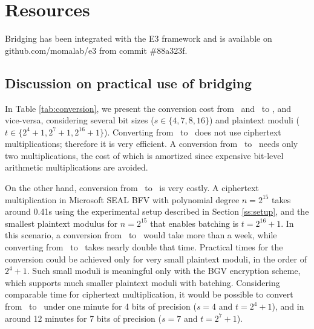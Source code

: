 
\vspace{-0.1cm}
\section*{Resources}

Bridging has been integrated with the E3 framework and is available on github.com/momalab/e3 from commit \#88a323f.
\subsection{Discussion on practical use of bridging}\label{ss:discussion}

In Table \ref{tab:conversion}, we present the conversion cost from \secuint\ and \secint\ to \secmod, and vice-versa, considering several bit sizes ($s \in \{4, 7, 8, 16\}$) and plaintext moduli ($t \in \{2^4+1, 2^7+1, 2^{16}+1\}$).
Converting from \secuint\ to \secmod\ does not use ciphertext multiplications; therefore it is very efficient.
A conversion from \secint\ to \secmod\ needs only two multiplications, the cost of which is amortized since expensive bit-level arithmetic multiplications are avoided.

On the other hand, conversion from \secmod\ to \secuint\ is very costly.
A ciphertext multiplication in Microsoft SEAL BFV with polynomial degree $n = 2^{15}$ takes around 0.41s using the experimental setup described in Section \ref{ss:setup}, and the smallest plaintext modulus for $n = 2^{15}$ that enables batching is $t = 2^{16}+1$.
In this scenario, a conversion from \secmod\ to \secuint\ would take more than a week, while converting from \secmod\ to \secint\ takes nearly double that time.
Practical times for the conversion could be achieved only for very small plaintext moduli, in the order of $2^4+1$. Such small moduli is meaningful only with the BGV encryption scheme, which supports much smaller plaintext moduli with batching.
Considering comparable time for ciphertext multiplication, it would be possible to convert from \secmod\ to \secuint\ under one minute for 4 bits of precision ($s = 4$ and $t = 2^4+1$), and in around 12 minutes for 7 bits of precision ($s = 7$ and $t = 2^7+1$).


